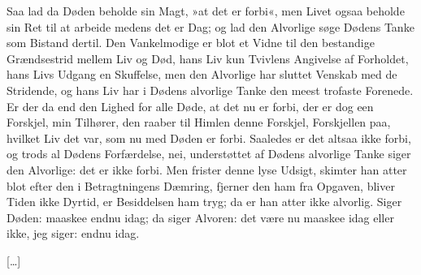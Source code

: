 \documentclass[12pt,a4paper]{article}
\begin{document}
Saa lad da Døden beholde sin Magt, »at det er forbi«, men Livet ogsaa beholde sin Ret til at arbeide medens det er Dag; og lad den Alvorlige søge Dødens Tanke som Bistand dertil. Den Vankelmodige er blot et Vidne til den bestandige Grændsestrid mellem Liv og Død, hans Liv kun Tvivlens Angivelse af Forholdet, hans Livs Udgang en Skuffelse, men den Alvorlige har sluttet Venskab med de Stridende, og hans Liv har i Dødens alvorlige Tanke den meest trofaste Forenede. Er der da end den Lighed for alle Døde, at det nu er forbi, der er dog een Forskjel, min Tilhører, den raaber til Himlen denne Forskjel, Forskjellen paa, hvilket Liv det var, som nu med Døden er forbi. Saaledes er det altsaa ikke forbi, og trods al Dødens Forfærdelse, nei, understøttet af Dødens alvorlige Tanke siger den Alvorlige: det er ikke forbi. Men frister denne lyse Udsigt, skimter han atter blot efter den i Betragtningens Dæmring, fjerner den ham fra Opgaven, bliver Tiden ikke Dyrtid, er Besiddelsen ham tryg; da er han atter ikke alvorlig. Siger Døden: maaskee endnu idag; da siger Alvoren: det være nu maaskee idag eller ikke, jeg siger: endnu idag.

[…]
\end{document}
